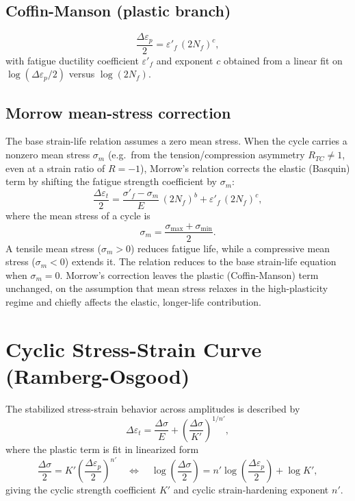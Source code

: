 \documentclass[11pt]{article}
\begin{document}
\subsection{Coffin-Manson (plastic branch)}
\begin{equation}
  \frac{\Delta\varepsilon_p}{2} = \varepsilon'_f\,(2N_f)^{c},
\end{equation}
with fatigue ductility coefficient $\varepsilon'_f$ and exponent $c$ obtained from a linear fit
on $\log(\Delta\varepsilon_p/2)$ versus $\log(2N_f)$.

\subsection{Morrow mean-stress correction}
\label{sec:morrow}
The base strain-life relation assumes a zero mean stress. When the cycle carries a nonzero
mean stress $\sigma_m$ (e.g.\ from the tension/compression asymmetry $R_{TC}\neq 1$, even at a
strain ratio of $R=-1$), Morrow's relation corrects the elastic (Basquin) term by shifting the
fatigue strength coefficient by $\sigma_m$:
\begin{equation}
  \frac{\Delta\varepsilon_t}{2}
  = \frac{\sigma'_f - \sigma_m}{E}\,(2N_f)^{b}
  + \varepsilon'_f\,(2N_f)^{c},
\end{equation}
where the mean stress of a cycle is
\begin{equation}
  \sigma_m = \frac{\sigma_{\max} + \sigma_{\min}}{2}.
\end{equation}
A tensile mean stress ($\sigma_m > 0$) reduces fatigue life, while a compressive mean stress
($\sigma_m < 0$) extends it. The relation reduces to the base strain-life equation when
$\sigma_m = 0$. Morrow's correction leaves the plastic (Coffin-Manson) term unchanged, on the
assumption that mean stress relaxes in the high-plasticity regime and chiefly affects the
elastic, longer-life contribution.

\section{Cyclic Stress-Strain Curve (Ramberg-Osgood)}

The stabilized stress-strain behavior across amplitudes is described by
\begin{equation}
  \Delta\varepsilon_t
  = \frac{\Delta\sigma}{E}
  + \left(\frac{\Delta\sigma}{K'}\right)^{1/n'},
\end{equation}
where the plastic term is fit in linearized form
\begin{equation}
  \frac{\Delta\sigma}{2} = K'\left(\frac{\Delta\varepsilon_p}{2}\right)^{n'}
  \quad\Longleftrightarrow\quad
  \log\!\left(\frac{\Delta\sigma}{2}\right)
  = n'\log\!\left(\frac{\Delta\varepsilon_p}{2}\right) + \log K',
\end{equation}
giving the cyclic strength coefficient $K'$ and cyclic strain-hardening exponent $n'$.
\end{document}
